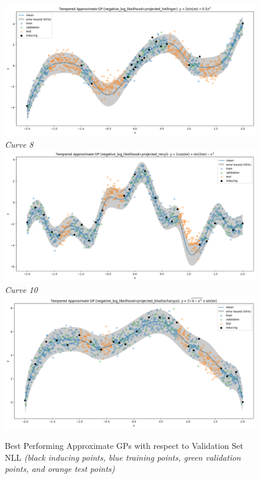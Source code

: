 \documentclass{article}
\numberwithin{equation}{section}
\begin{document}
\begin{figure}[h!]
\begin{minipage}{.5\textwidth}
  \includegraphics[width=\linewidth, trim={0 0 0 0.86cm},clip]{thesis-report/figures/toy_curves/curve5.png}
  \textit{Curve 8}
  \includegraphics[width=\linewidth, trim={0 0 0 0.85cm},clip]{thesis-report/figures/toy_curves/curve7.png}
  \textit{Curve 10}
  \includegraphics[width=\linewidth, trim={0 0 0 1.05cm},clip]{thesis-report/figures/toy_curves/curve9.png}
  \end{minipage}%
\caption{Best Performing Approximate GPs with respect to Validation Set NLL \textit{(black inducing points, blue training points, green validation points, and orange test points)}}
\label{figure:toy-curves-gps}
\end{figure}
\end{document}
